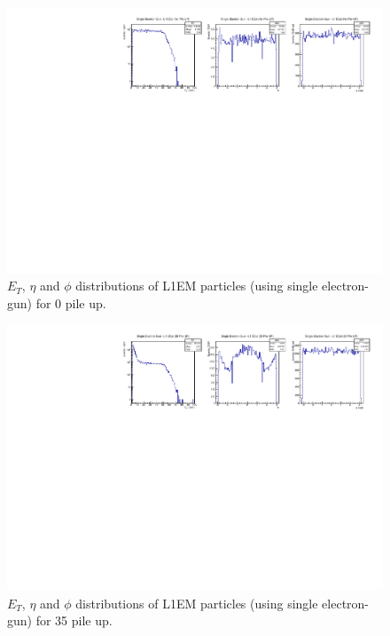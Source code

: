 \begin{figure}[!htb]
  \centering
  \includegraphics[scale=0.8]{../SimulationTools/L1EM_EtEtaPhi_0PileUP.pdf}
  \caption{$E_{T}$, $\eta$ and $\phi$ distributions of L1EM particles (using single electron-gun) for 0 pile up.}
  \label{fig:L1EM_EtEtaPhi_0PileUP}
\end{figure}

\begin{figure}[!htb]
  \centering
  \includegraphics[scale=0.8]{../SimulationTools/L1EM_EtEtaPhi_35PileUP.pdf}
  \caption{$E_{T}$, $\eta$ and $\phi$ distributions of L1EM particles (using single electron-gun) for 35 pile up.}
  \label{fig:L1EM_EtEtaPhi_35PileUP}
\end{figure}

